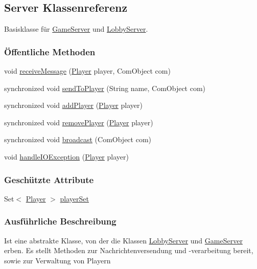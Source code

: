 \hypertarget{a00077}{\subsection{Server Klassenreferenz}
\label{a00077}
}


Basisklasse für \hyperlink{a00072}{Game\-Server} und \hyperlink{a00074}{Lobby\-Server}.

\subsubsection*{Öffentliche Methoden}
\begin{DoxyCompactItemize}
\item 
void \hyperlink{a00077_aab90f477a811b12d935c46ec7cbabb08}{receive\-Message} (\hyperlink{a00076}{Player} player, Com\-Object com)
\item 
synchronized void \hyperlink{a00077_ac90f610b90effa3a0cf572d3cbe270c3}{send\-To\-Player} (String name, Com\-Object com)
\item 
synchronized void \hyperlink{a00077_ac0a0163cec54e6202131c76962d7834b}{add\-Player} (\hyperlink{a00076}{Player} player)
\item 
synchronized void \hyperlink{a00077_a8b2712c19a20e54b3c5d99ce9d21112e}{remove\-Player} (\hyperlink{a00076}{Player} player)
\item 
synchronized void \hyperlink{a00077_aa5dbc77abbcc945c59d4edc75e55e7cf}{broadcast} (Com\-Object com)
\item 
void \hyperlink{a00077_af3ddb51daa156429385870eb04bd456e}{handle\-I\-O\-Exception} (\hyperlink{a00076}{Player} player)
\end{DoxyCompactItemize}
\subsubsection*{Geschützte Attribute}
\begin{DoxyCompactItemize}
\item 
\hypertarget{a00077_ab10ffe465a33e3a82e0132c97628b9a5}{Set$<$ \hyperlink{a00076}{Player} $>$ \hyperlink{a00077_ab10ffe465a33e3a82e0132c97628b9a5}{player\-Set}}\label{a00077_ab10ffe465a33e3a82e0132c97628b9a5}

\end{DoxyCompactItemize}


\subsubsection{Ausführliche Beschreibung}
Ist eine abstrakte Klasse, von der die Klassen \hyperlink{a00074}{Lobby\-Server} und \hyperlink{a00072}{Game\-Server} erben. Es stellt Methoden zur Nachrichtenversendung und -\/verarbeitung bereit, sowie zur Verwaltung von Playern 

